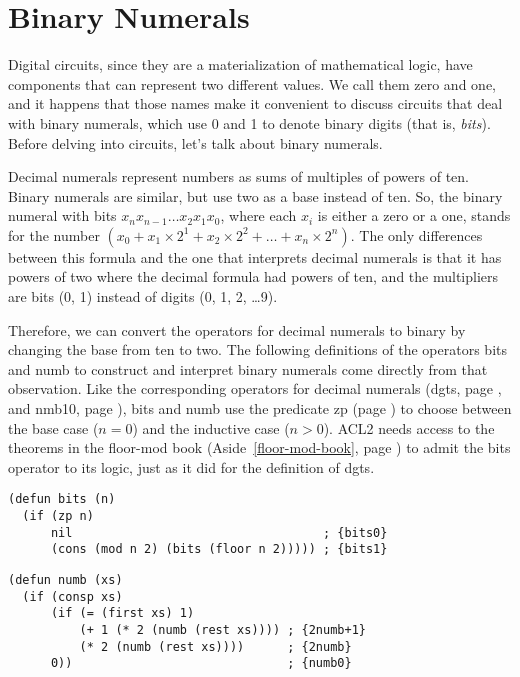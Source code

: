\section{Binary Numerals}
\label{sec:binary-numerals}

Digital circuits, since they are a materialization of mathematical logic,
have components that can represent two different values.
We call them zero and one, and it happens that those names
make it convenient to discuss circuits that deal with binary numerals,
which use 0 and 1 to denote binary digits
(that is, \emph{bits}).
Before delving into circuits, let's talk about binary numerals.

Decimal numerals represent numbers as sums of multiples of powers of ten.
Binary numerals are similar, but use two as a base instead of ten.
So, the binary numeral with bits $x_nx_{n-1}\dots x_2x_1x_0$,
where each $x_i$ is either a zero or a one, stands for the number
$(x_0 + x_1 \times 2^1 + x_2 \times 2^2 + \dots + x_{n} \times 2^{n})$.
The only differences between this formula and the one that interprets
decimal numerals is that it has powers of two where the decimal formula had
powers of ten, and the multipliers are bits (0, 1) instead of
digits (0, 1, 2, \dots 9).

Therefore, we can convert the operators for decimal numerals to binary
by changing the base from ten to two.
The following definitions of the operators \textsf{bits} and \textsf{numb}
to construct and interpret binary numerals come directly
from that observation.
Like the corresponding operators for decimal numerals
(\textsf{dgts}, page \pageref{dgts-defun}, and \textsf{nmb10}, page \pageref{nmb10-defun}),
\textsf{bits} and \textsf{numb} use the predicate \textsf{zp} (page \pageref{zp-def}) to choose
between the base case ($n = 0$) and the inductive case ($n > 0$).
ACL2 needs access to the theorems
in the floor-mod book (Aside~\ref{floor-mod-book}, page \pageref{floor-mod-book})
to admit the \textsf{bits} operator to its logic,
just as it did for the definition of \textsf{dgts}.

\label{bits-defun}
\begin{Verbatim}
(defun bits (n)
  (if (zp n)
      nil                                   ; {bits0}
      (cons (mod n 2) (bits (floor n 2))))) ; {bits1}
\end{Verbatim}
\label{nmb-defun}
\begin{Verbatim}
(defun numb (xs)
  (if (consp xs)
      (if (= (first xs) 1)
          (+ 1 (* 2 (numb (rest xs)))) ; {2numb+1}
          (* 2 (numb (rest xs))))      ; {2numb}
      0))                              ; {numb0}
\end{Verbatim}

